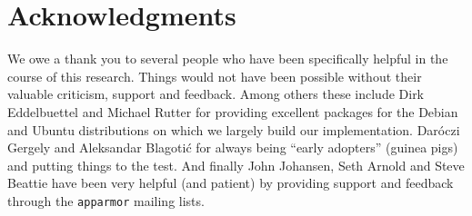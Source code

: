 \documentclass{jss}
\begin{document}
\section{Acknowledgments}

We owe a thank you to several people who have been specifically helpful in the
course of this research. Things would not have been possible without their 
valuable criticism, support and feedback. Among others these include Dirk
Eddelbuettel and Michael Rutter for providing excellent packages for the Debian
and Ubuntu distributions on which we largely build our implementation. Daróczi
Gergely and Aleksandar Blagotić for always being ``early adopters'' (guinea
pigs) and putting things to the test. And finally John Johansen, Seth Arnold and
Steve Beattie have been very helpful (and patient) by providing support and
feedback through the \texttt{apparmor} mailing lists.
\end{document}
